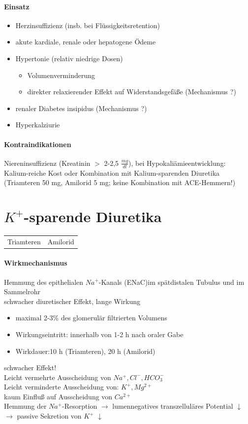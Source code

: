 \documentclass[10pt,a4paper]{report}
\begin{document}
\paragraph{Einsatz}
\begin{itemize}
	\item Herzinsuffizienz (insb. bei Flüssigkeitsretention)
	\item akute kardiale, renale oder hepatogene Ödeme
	\item Hypertonie (relativ niedrige Dosen)
	\begin{itemize}
		\item Volumenverminderung
		\item direkter relaxierender Effekt auf Widerstandsgefäße (Mechanismus ?)
	\end{itemize}		
	\item renaler Diabetes insipidus (Mechanismus ?)
	\item Hyperkalziurie
\end{itemize}
\paragraph{Kontraindikationen}Niereninsuffizienz (Kreatinin $>$ 2-2,5 $\frac{mg}{dl}$), bei Hypokaliämieentwicklung: Kalium-reiche Kost oder Kombination mit Kalium-sparenden Diuretika (Triamteren 50 mg, Amilorid 5 mg; keine Kombination mit ACE-Hemmern!)
\section{$K^+$-sparende Diuretika}
\begin{tabularx}{\textwidth}{XX}
Triamteren&Amilorid\\
\end{tabularx}
\paragraph{Wirkmechanismus}
Hemmung des epithelialen $Na^+$-Kanals (ENaC)im spätdistalen Tubulus und im Sammelrohr\\
schwacher diuretischer Effekt, lange Wirkung
\begin{itemize}
	\item maximal 2-3\% des glomerulär filtrierten Volumens
	\item Wirkungseintritt: innerhalb von 1-2 h nach oraler Gabe
	\item Wirkdauer:10 h (Triamteren), 20 h (Amilorid)
\end{itemize}
schwacher Effekt!
\\
Leicht vermehrte Ausscheidung von $Na^+, Cl^-, HCO_3^-$\\ 
Leicht verminderte Ausscheidung von: $K^+, Mg^{2+}$\\
kaum Einfluß auf Ausscheidung von $Ca^{2+}$\\
Hemmung der $Na^+$-Resorption $\rightarrow$ lumennegatives transzelluläres Potential $\downarrow$ $\rightarrow$ passive Sekretion von $K^+$ $\downarrow$
\end{document}

